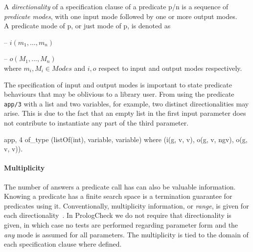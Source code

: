 \documentclass[runningheads,a4paper]{../../PaperStyles/llncs}
\newcommand{\yap}[1]{\lstinline[style=yap]{#1}}
\newcommand{\todo}[2][?]{\marginpar{\raggedright \tiny TODO: #2}}
\newcommand{\plqc}[0]{{\sf PrologCheck}}
\begin{document}
\begin{definition}
\label{def:directionality}
A \emph{directionality} of a specification clause of a predicate
p/n is a sequence of \emph{predicate modes}, with one input mode
followed by one or more output modes.
\\
A predicate mode of p, or just mode of p, is denoted as

\;\;  -- $i(m_1, ..., m_n)$

\;\;  -- $o(M_1, ..., M_n)$
\\
where $m_i,M_i \in Modes$ and $i, o$ respect to input and output modes
respectively.
\end{definition}


The specification of input and output modes is important to state
predicate behaviours that may be oblivious to a library user.
%
From using the predicate \yap{app/3} with a list and two variables, for
example, two distinct directionalities may arise.
%
This is due to the fact that an empty list in the first input parameter does
not contribute to instantiate any part of the third parameter.
%
\begin{yapcode}
 {app, 4} of_type (listOf(int), variable, variable)
    where (i(g, v, v), o(g, v, ngv), o(g, v, v)).
\end{yapcode}


\paragraph{\bf Multiplicity}
The number of answers a predicate call has can also be valuable
information.
%
Knowing a predicate has a finite search space is a termination
guarantee for predicates using it.
%
Conventionally, multiplicity information, or \emph{range}, is given for
each directionality~\cite{somogyi1995mercury}.
%
In \plqc{} we do not require that directionality is given, in which
case no tests are performed regarding parameter form and the \emph{any}
mode is assumed for all parameters.
%
The multiplicity is tied to the domain of each specification clause
where defined.
\end{document}
